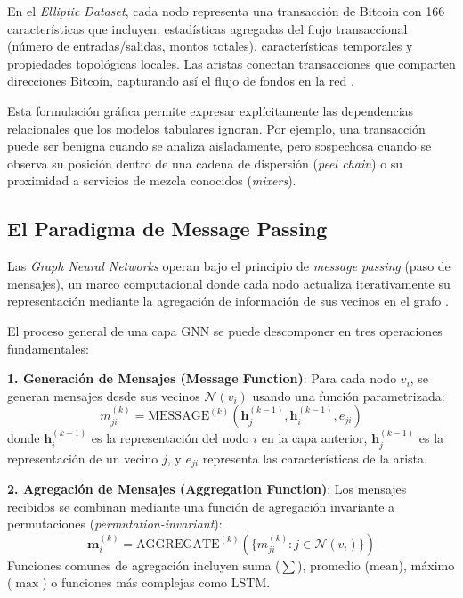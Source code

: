 En el \textit{Elliptic Dataset}, cada nodo representa una transacción de Bitcoin con 166 características que incluyen: estadísticas agregadas del flujo transaccional (número de entradas/salidas, montos totales), características temporales y propiedades topológicas locales. Las aristas conectan transacciones que comparten direcciones Bitcoin, capturando así el flujo de fondos en la red \cite{Weber2019Anti-MoneyForensics, Lawal2025AnDataset}.

Esta formulación gráfica permite expresar explícitamente las dependencias relacionales que los modelos tabulares ignoran. Por ejemplo, una transacción puede ser benigna cuando se analiza aisladamente, pero sospechosa cuando se observa su posición dentro de una cadena de dispersión (\textit{peel chain}) o su proximidad a servicios de mezcla conocidos (\textit{mixers}).

\subsection{El Paradigma de Message Passing}

Las \textit{Graph Neural Networks} operan bajo el principio de \textit{message passing} (paso de mensajes), un marco computacional donde cada nodo actualiza iterativamente su representación mediante la agregación de información de sus vecinos en el grafo \cite{Du2017TopologyNetworks, He2026AnDetection}.

El proceso general de una capa GNN se puede descomponer en tres operaciones fundamentales:

\textbf{1. Generación de Mensajes (Message Function)}: Para cada nodo $v_i$, se generan mensajes desde sus vecinos $\mathcal{N}(v_i)$ usando una función parametrizada:
\[ m_{ji}^{(k)} = \text{MESSAGE}^{(k)}(\mathbf{h}_j^{(k-1)}, \mathbf{h}_i^{(k-1)}, e_{ji}) \]
donde $\mathbf{h}_i^{(k-1)}$ es la representación del nodo $i$ en la capa anterior, $\mathbf{h}_j^{(k-1)}$ es la representación de un vecino $j$, y $e_{ji}$ representa las características de la arista.

\textbf{2. Agregación de Mensajes (Aggregation Function)}: Los mensajes recibidos se combinan mediante una función de agregación invariante a permutaciones (\textit{permutation-invariant}):
\[ \mathbf{m}_i^{(k)} = \text{AGGREGATE}^{(k)} \left( \{m_{ji}^{(k)} : j \in \mathcal{N}(v_i)\} \right) \]
Funciones comunes de agregación incluyen suma ($\sum$), promedio ($\text{mean}$), máximo ($\max$) o funciones más complejas como LSTM.

